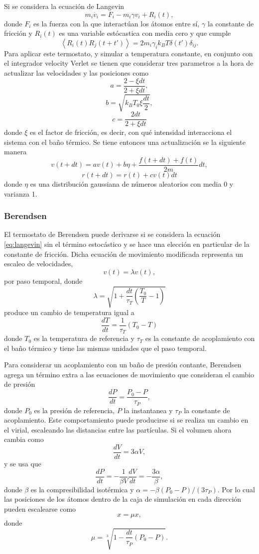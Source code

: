 Si se considera la ecuación de Langevin \cite{schneider1978}
\begin{equation}\label{eq:langevin}
    m_i \dot{v_i} = F_i - m_i \gamma v_i + R_i(t),
\end{equation}
donde $F_i$ es la fuerza con la que interactúan los átomos entre sí, $\gamma$ la
constante de fricción y $R_i(t)$ es una variable estócastica con media cero 
y que cumple
$$
\left\langle R_i(t) R_j(t+t') \right\rangle = 2m_i \gamma_i k_B T \delta(t') \delta_{ij}.
$$
Para aplicar este termostato, y simular a temperatura constante, en conjunto con 
el integrador velocity Verlet se tienen que considerar tres parametros \cite{kroger2005}
a la hora de actualizar las velocidades y las posiciones como
$$
a = \frac{2 - \xi dt}{2 + \xi dt},
$$
$$
b= \sqrt{k_B T_0 \xi \frac{dt}{2}},
$$
$$
c= \frac{2 dt}{2 + \xi dt}
$$
donde $\xi$ es el factor de fricción, es decir, con qué intensidad interacciona 
el sistema con el baño térmico. Se tiene entonces una actualización se la siguiente
manera
$$
v(t+dt) = a v(t) + b \eta + \frac{f(t+dt)+f(t)}{2m} dt,
$$
$$
r(t+dt) = r(t) + c v(t) dt
$$
donde $\eta$ es una distribución gaussiana de números aleatorios con media 0 y
varianza 1. 

\subsubsection{Berendsen}

El termostato de Berendsen \cite{berendsen1984} puede derivarse si se considera 
la ecuación \ref{eq:langevin} sin el término estocástico y se hace una elección
en particular de la constante de fricción. Dicha ecuación de movimiento modificada
representa un escaleo de velocidades, 
$$
v(t) = \lambda v(t),
$$
por paso temporal, donde
$$
\lambda = \sqrt{1 + \frac{dt}{\tau_T} \left( \frac{T_0}{T} - 1 \right)}
$$
produce un cambio de temperatura igual a
$$
\frac{dT}{dt} = \frac{1}{\tau_T} (T_0 - T)
$$
donde $T_0$ es la temperatura de referencia y  $\tau_T$ es la constante de
acoplamiento con el baño térmico y tiene las mismas unidades que el paso temporal.

Para considerar un acoplamiento con un baño de presión contante, Berendsen 
\cite{berendsen1984} agrega un término extra a las ecuaciones de movimiento que
consideran el cambio de presión
$$
\frac{dP}{dt} = \frac{P_0 - P}{\tau_P},
$$
donde $P_0$ es la presión de referencia, $P$ la instantanea y $\tau_P$ la 
constante de acoplamiento. Este comportamiento puede producirse si se realiza un
cambio en el virial, escaleando las distancias entre las partículas. Si el 
volumen ahora cambia como 
$$
\frac{dV}{dt} = 3 \alpha V,
$$
y se usa que
$$
\frac{dP}{dt} = - \frac{1}{\beta V} \frac{dV}{dt} = -\frac{3\alpha}{\beta},
$$
donde $\beta$ es la compresibilidad isotérmica y $\alpha = - \beta (P_0 - P) / (3 \tau_P)$.
Por lo cual las posiciones de los átomos dentro de la caja de simulación en cada
dirección pueden escalearse como
$$
x = \mu x,
$$
donde
$$
\mu = \sqrt[3]{1 - \frac{dt}{\tau_P} (P_0 - P)}.
$$

